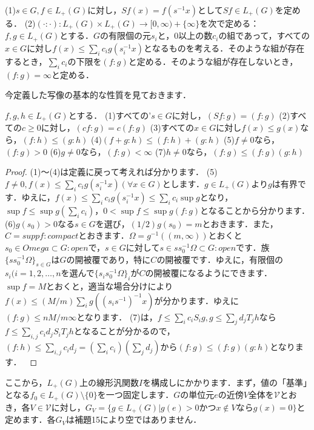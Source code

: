 \begin{defi}
(1)$s \in G, f \in L_{+}(G)$に対し，$Sf(x)=f(s^{-1}x)$として$Sf \in L_{+}(G)$を定める．
(2)$(\cdot \colon \cdot ) \colon L_{+}(G) \times L_{+}(G) \to [0, \infty)+\{ \infty \}$を次で定める：$f, g \in L_{+}(G)$とする．$G$の有限個の元$s_i$と，0以上の数$c_i$の組であって，すべての$x \in G$に対し$f(x) \le \sum_{i}c_{i} g(s_{i}^{-1}x)$となるものを考える．そのような組が存在するとき，$\sum_{i}c_i$の下限を$(f \colon g)$と定める．そのような組が存在しないとき，$(f \colon g)=\infty$と定める．
\end{defi}
今定義した写像の基本的な性質を見ておきます．
\begin{prop}
$f, g, h \in L_{+}(G)$とする．
(1)すべての'$s \in G$に対し，$(Sf \colon g)=(f \colon g)$
(2)すべての$c \ge 0$に対し，$(cf \colon g)=c(f \colon g)$
(3)すべての$x \in G$に対し$f(x) \le g(x)$なら，$(f \colon h) \le (g \colon h)$
(4)$(f+g \colon h) \le (f \colon h)+(g \colon h)$
(5)$f \ne 0$なら，$( f \colon g ) > 0$
(6)$g \ne 0$なら，$( f \colon g ) < \infty $
(7)$h \ne 0$なら，$( f \colon g ) \le (f \colon g ) (g \colon h )$
\end{prop}
\begin{proof}
(1)〜(4)は定義に戻って考えれば分かります．
(5)$f \ne 0, f(x) \le \sum_{i}c_{i} g(s_{i}^{-1}x) (\forall x \in G)$とします．$g \in L_{+}(G)$より$g$は有界です．ゆえに，$f(x) \le \sum_{i}c_{i} g(s_{i}^{-1}x) \le \sum_{i}c_{i} \sup g$となり，$\sup f \le \sup g ( \sum_{i}c_{i} )$，$0<\sup f \le \sup g (f \colon g )$となることから分かります．
(6)$g(s_{0}) > 0$なる$s \in G$を選び，$(1/2)g(s_{0})=m$とおきます．また，$C=supp f \colon compact$とおきます．$\Omega = g^{-1}( (m, \infty) )$とおくと$s_{0} \in Omega \subset G \colon open$で，$s \in G$に対して$s \in s s_{0}^{-1} \Omega \subset G \colon open$です．族$\{ s s_{0}^{-1}\Omega \}_{s \in G}$は$G$の開被覆であり，特に$C$の開被覆です．ゆえに，有限個の$ s_i(i=1,2, \ldots , n$を選んで$\{ s_{i} s_{0}^{-1}\Omega \}_{i}$が$C$の開被覆になるようにできます．$\sup f=M$とおくと，適当な場合分けにより$f(x) \le (M/m)\sum_{i} g( (s_{i} s^{-1}) ^{-1}x)$が分かります．ゆえに$(f \colon g ) \le nM/m \infty $となります．
(7)は，$f \le \sum_{i} c_{i}S_{i}g, g \le \sum_{j} d_{j}T_{j}h$なら$f \le \sum_{i,j} c_{i}d_{j}S_iT_{j}h$となることが分かるので，$(f \colon h ) \le \sum_{i,j} c_{i}d_{j} = ( \sum_{i} c_{i} ) (\sum_{j} d_{j} )$から$( f \colon g ) \le (f \colon g ) (g \colon h )$となります．　
\end{proof}

ここから，$L_{+}(G)$上の線形汎関数$I$を構成しにかかります．まず，値の「基準」となる$f_{0} \in L_{+}(G) \setminus \{ 0 \}$を一つ固定します．$G$の単位元$e$の近傍$V$全体を$\mathscr{V}$とおき，各$V \in \mathscr{V}$に対し，$G_{V}=\{ g \in L_{+}(G) | g(e)>0 かつ x \not\in V ならg(x)=0 \}$と定めます．各$G_V$は補題15により空ではありません．

